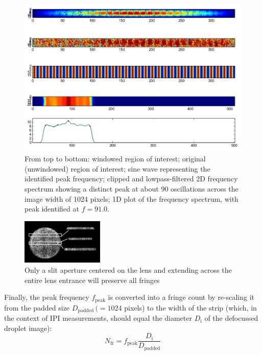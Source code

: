 \documentclass[11.5pt]{book}
\begin{document}
\begin{figure}[h]
    \centering
    \includegraphics[height=0.38\textheight]{img/globalsizing-dropletpeak.png}
    \caption{From top to bottom: windowed region of interest; original
    (unwindowed) region of interest; sine wave representing the identified peak
frequency; clipped and lowpass-filtered 2D frequency spectrum showing a distinct
peak at about 90 oscillations across the image width of 1024 pixels; 1D plot of
the frequency spectrum, with peak identified at $f=91.0$.}
    \label{fig:globalsizing-dropletpeak}
\end{figure}

\begin{figure}
    \centering
    \includegraphics[width=0.35\textwidth]{img/dropletslitcropping2.jpg}
    \caption{Only a slit aperture centered on the lens and extending across the
    entire lens entrance will preserve all fringes \label{fig:droplet-slitcropping}}
\end{figure}
Finally, the peak frequency $f_\text{peak}$ is converted into a fringe count by re-scaling it
from the padded size $D_\text{padded}\, (= 1024$ pixels) to the width of the strip (which, in the
context of IPI measurements, should equal the diameter $D_\text{i}$ of the defocussed droplet
image):
\begin{equation}
    N_\text{fr} = f_\text{peak} \frac{D_\text{i}}{D_\text{padded}}
    \label{fringes-from-diameter}
\end{equation}
\end{document}
